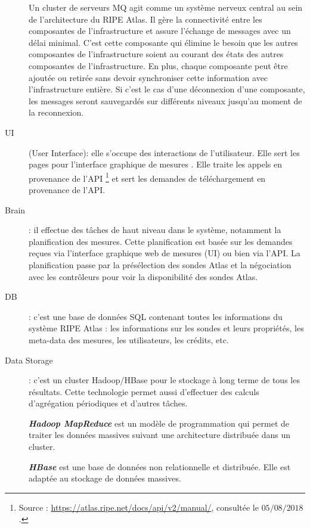 \begin{description}
	Un cluster de serveurs MQ  agit comme un système nerveux central au sein de l'architecture du RIPE Atlas. Il gère la connectivité entre les composantes de l'infrastructure et  assure l'échange de messages avec un délai minimal. C'est cette composante qui élimine le besoin que les autres composantes de l'infrastructure soient au courant des états des autres composantes de l'infrastructure. En plus, chaque composante peut être ajoutée ou retirée sans devoir synchroniser cette information avec l'infrastructure entière. Si c'est le cas d'une déconnexion d'une composante, les messages seront sauvegardés sur différents niveaux jusqu'au moment de la reconnexion.
	
	
	
	\item [UI] (User Interface): elle s'occupe des interactions de l'utilisateur. Elle sert les pages pour l'interface graphique de mesures \cite{create-UDM}. Elle traite les appels en provenance de l'API \footnote{Source : \url{https://atlas.ripe.net/docs/api/v2/manual/}, consultée le $05/08/2018$.} et sert les demandes de téléchargement en provenance de l'API.
	
	\item [Brain] : il effectue des tâches de haut niveau dans le système, notamment la planification des mesures. Cette planification est basée sur les demandes reçues via l'interface graphique web de mesures (UI) ou bien via l'API. La planification passe par la  présélection des sondes Atlas et la négociation avec les contrôleurs pour voir la disponibilité des sondes Atlas. 
	
	
	\item [DB] : c'est une base de données SQL contenant toutes les informations du système RIPE Atlas : les informations sur les sondes et leurs propriétés, les meta-data des mesures, les utilisateurs, les crédits, etc. 
	
	\item [Data Storage] : c'est un cluster Hadoop/HBase pour le stockage à long terme de tous les résultats. Cette technologie permet aussi d'effectuer des calculs d'agrégation périodiques et  d'autres tâches. 
	
	
	\begin{tcolorbox}
		\textbf{\textit{Hadoop MapReduce}} est un modèle de programmation qui permet de traiter les données massives suivant une architecture distribuée dans un cluster.
		
		\textbf{\textit{HBase}} est une base de données non relationnelle et distribuée. Elle est adaptée au stockage de données massives.
	\end{tcolorbox} 
	
\end{description}



